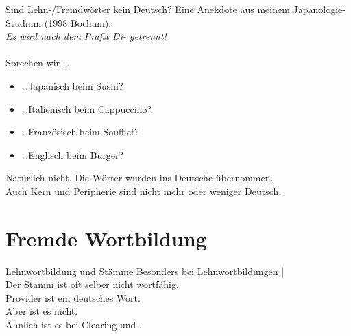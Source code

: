 \begin{frame}
  {Sind Lehn-\slash Fremdwörter kein Deutsch?}
  \onslide<+->
  \onslide<+->
  Eine Anekdote aus meinem Japanologie-Studium (1998 Bochum):\\
  \textit{ Es wird nach dem Präfix Di- getrennt!}\\
  \onslide<+->
  \Halbzeile
  \\
  \onslide<+->
  \Zeile
  Sprechen wir \ldots
  \begin{itemize}[<+->]
    \item \ldots Japanisch beim \alert{Sushi}?
    \item \ldots Italienisch beim \alert{Cappuccino}?
    \item \ldots Französisch beim \alert{Soufflet}?
    \item \ldots Englisch beim \alert{Burger}?
  \end{itemize}
  \Halbzeile
  \onslide<+->
  Natürlich nicht. Die Wörter wurden \alert{ins Deutsche übernommen}.\\
  \Viertelzeile
  Auch \alert{Kern und Peripherie} sind nicht mehr oder weniger Deutsch.
\end{frame}

\section{Fremde Wortbildung}

\begin{frame}
  {Lehnwortbildung und Stämme}
  \onslide<+->
  \onslide<+->
  Besonders bei Lehnwortbildungen |\\
  \Viertelzeile
  Der \alert{Stamm} ist oft selber \alert{nicht wortfähig}.\\
  \Zeile
  \onslide<+->
  \alert{Provider} ist ein deutsches Wort.\\
  \onslide<+->
  Aber  ist es nicht.\\
  \Halbzeile 
  \onslide<+->
  Ähnlich ist es bei \alert{Clearing} und .\\
  \onslide<+->
  \Zeile
\end{frame}

